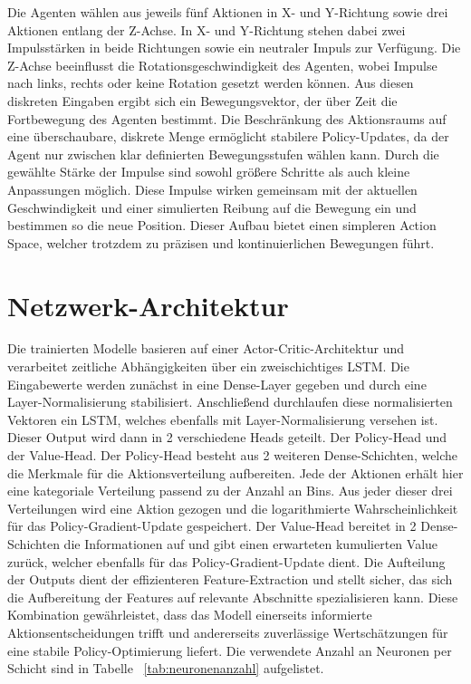 Die Agenten wählen aus jeweils fünf Aktionen in X- und Y-Richtung sowie drei Aktionen entlang der Z-Achse. In X- und Y-Richtung stehen dabei zwei Impulsstärken in beide Richtungen sowie ein neutraler Impuls zur Verfügung. Die Z-Achse beeinflusst die Rotationsgeschwindigkeit des Agenten, wobei Impulse nach links, rechts oder keine Rotation gesetzt werden können. Aus diesen diskreten Eingaben ergibt sich ein Bewegungsvektor, der über Zeit die Fortbewegung des Agenten bestimmt. Die Beschränkung des Aktionsraums auf eine überschaubare, diskrete Menge ermöglicht stabilere Policy-Updates, da der Agent nur zwischen klar definierten Bewegungsstufen wählen kann. Durch die gewählte Stärke der Impulse sind sowohl größere Schritte als auch kleine Anpassungen möglich. Diese Impulse wirken gemeinsam mit der aktuellen Geschwindigkeit und einer simulierten Reibung auf die Bewegung ein und bestimmen so die neue Position. Dieser Aufbau bietet einen simpleren Action Space, welcher trotzdem zu präzisen und kontinuierlichen Bewegungen führt. 


\section{Netzwerk-Architektur}
Die trainierten Modelle basieren auf einer Actor-Critic-Architektur und verarbeitet zeitliche Abhängigkeiten über ein zweischichtiges LSTM. Die Eingabewerte werden zunächst in eine Dense-Layer gegeben und durch eine Layer-Normalisierung stabilisiert. Anschließend durchlaufen diese normalisierten Vektoren ein LSTM, welches ebenfalls mit Layer-Normalisierung versehen ist. Dieser Output wird dann in 2 verschiedene Heads geteilt. Der Policy-Head und der Value-Head. Der Policy-Head besteht aus 2 weiteren Dense-Schichten, welche die Merkmale für die Aktionsverteilung aufbereiten. Jede der Aktionen erhält hier eine kategoriale Verteilung passend zu der Anzahl an Bins. Aus jeder dieser drei Verteilungen wird eine Aktion gezogen und die logarithmierte Wahrscheinlichkeit für das Policy-Gradient-Update gespeichert. Der Value-Head bereitet in 2 Dense-Schichten die Informationen auf und gibt einen erwarteten kumulierten Value zurück, welcher ebenfalls für das Policy-Gradient-Update dient. Die Aufteilung der Outputs dient der effizienteren Feature-Extraction und stellt sicher, das sich die Aufbereitung der Features auf relevante Abschnitte spezialisieren kann. Diese Kombination gewährleistet, dass das Modell einerseits informierte Aktionsentscheidungen trifft und andererseits zuverlässige Wertschätzungen für eine stabile Policy-Optimierung liefert. Die verwendete Anzahl an Neuronen per Schicht sind in Tabelle ~\ref{tab:neuronenanzahl} aufgelistet.


